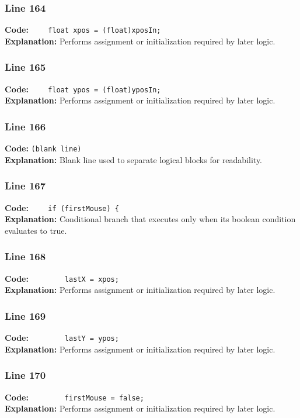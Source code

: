 \documentclass[11pt,a4paper]{article}
\begin{document}
\subsubsection*{Line 164}
\textbf{Code:} \verb|    float xpos = (float)xposIn;|\\
\textbf{Explanation:} Performs assignment or initialization required by later logic.

\subsubsection*{Line 165}
\textbf{Code:} \verb|    float ypos = (float)yposIn;|\\
\textbf{Explanation:} Performs assignment or initialization required by later logic.

\subsubsection*{Line 166}
\textbf{Code:} \texttt{(blank line)}\\
\textbf{Explanation:} Blank line used to separate logical blocks for readability.

\subsubsection*{Line 167}
\textbf{Code:} \verb|    if (firstMouse) {|\\
\textbf{Explanation:} Conditional branch that executes only when its boolean condition evaluates to true.

\subsubsection*{Line 168}
\textbf{Code:} \verb|        lastX = xpos;|\\
\textbf{Explanation:} Performs assignment or initialization required by later logic.

\subsubsection*{Line 169}
\textbf{Code:} \verb|        lastY = ypos;|\\
\textbf{Explanation:} Performs assignment or initialization required by later logic.

\subsubsection*{Line 170}
\textbf{Code:} \verb|        firstMouse = false;|\\
\textbf{Explanation:} Performs assignment or initialization required by later logic.
\end{document}
